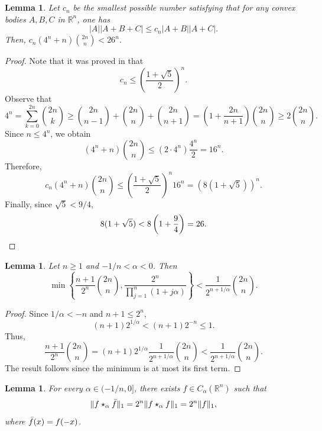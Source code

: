 \documentclass[11pt]{amsart}
\newcommand{\R}{{\mathbb R}}
\theoremstyle{plain}
\newtheorem{lemma}[theorem]{Lemma}
\theoremstyle{definition}
\theoremstyle{remark}
\begin{document}
\appendix

\section{}\label{appendixtech}
\begin{lemma} \label{upper-bound-c}
    Let $c_n$ be the smallest possible number satisfying that for any convex bodies $A,B,C$ in $\R^n$, one has
\begin{equation}
    |A| |A+B+C| \leq c_n |A+B| |A+C|.
\end{equation}
Then, $c_n (4^n +n) \binom{2n}{n}<26^n$.
\end{lemma}
\begin{proof}
Note that it was proved in \cite{FMZ-24} that
$$
c_n \leq\left(\frac{1+\sqrt{5}}{2}\right)^n .
$$
Observe that
\[
     4^n=\sum_{k=0}^{2 n}\binom{2 n}{k} \geq\binom{ 2 n}{n-1}+\binom{2 n}{n}+\binom{2 n}{n+1} =\left(1+\frac{2 n}{n+1}\right)\binom{2 n}{n} \geq 2 \binom{2n}{n}.
\]
    Since $n \leq 4^n$,
    we obtain
$$
\left(4^n+n\right)\binom{2 n}{n} \leq\left(2 \cdot 4^n\right) \frac{4^n}{2}=16^n .
$$
Therefore,
$$
c_n\left(4^n+n\right)\binom{2 n}{n} \leq\left(\frac{1+\sqrt{5}}{2}\right)^n 16^n
 =(8(1+\sqrt{5}))^n .
$$
Finally, since $\sqrt{5}<9 / 4$,
\[
8(1+\sqrt{5})<8\left(1+\frac{9}{4}\right)=26 . \qedhere
\]
\end{proof}
\begin{lemma} \label{lem:computation}
    Let $n \geq 1$ and $-1 / n<\alpha<0$. Then
$$
\min \left\{\frac{n+1}{2^n}\binom{2 n}{n}, \frac{2^n}{\prod_{j=1}^n(1+j \alpha)}\right\}<\frac{1}{2^{n+1 / \alpha}}\binom{2 n}{n} .
$$
\end{lemma}
\begin{proof}
    Since $1 / \alpha<-n$ and $n+1 \leq 2^n$,
$$
(n+1) 2^{1 / \alpha}<(n+1) 2^{-n} \leq 1 .
$$
Thus,
$$
\frac{n+1}{2^n}\binom{2 n}{n}=(n+1) 2^{1 / \alpha} \frac{1}{2^{n+1 / \alpha}}\binom{2 n}{n}<\frac{1}{2^{n+1 / \alpha}}\binom{2 n}{n} .
$$
The result follows since the minimum is at most its first term.
\end{proof}

\begin{lemma}
    \label{lem: counter-example}
    For every $\alpha \in(-1 / n, 0]$, there exists $f \in C_\alpha\left(\mathbb{R}^n\right)$ such that
    \[
        \|f \star_\alpha \Bar{f} \|_1= 2^n \|f \star_\alpha f\|_1 = 2^n\|f\|_1,
    \]
    where $ \Bar{f}(x) = f(-x)$.
\end{lemma}
\end{document}
